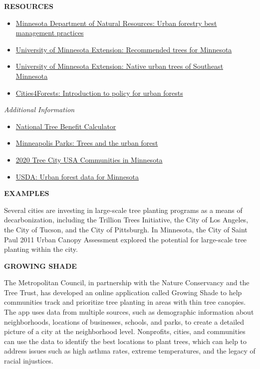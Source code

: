 \documentclass[
]{book}
\providecommand{\tightlist}{%
  \setlength{\itemsep}{0pt}\setlength{\parskip}{0pt}}
\begin{document}
\textbf{RESOURCES}

\begin{itemize}
\tightlist
\item
  \href{https://www.dnr.state.mn.us/forestry/urban/bmps.html}{Minnesota Department of Natural Resources: Urban forestry best management practices}
\item
  \href{https://extension.umn.edu/tree-selection-and-care/recommended-trees-minnesota}{University of Minnesota Extension: Recommended trees for Minnesota}
\item
  \href{https://www.minnesotamasternaturalist.org/docs/invasive_blitz/native_urban_trees_of_se_mn.pdf}{University of Minnesota Extension: Native urban trees of Southeast Minnesota}
\item
  \href{https://cities4forests.com/lg-urban-forests/introduction-to-policy-for-urban-forests/}{Cities4Forests: Introduction to policy for urban forests}
\end{itemize}

\emph{Additional Information}

\begin{itemize}
\tightlist
\item
  \href{http://www.treebenefits.com/calculator/}{National Tree Benefit Calculator}
\item
  \href{https://www.minneapolisparks.org/park_care__improvements/trees/}{Minneapolis Parks: Trees and the urban forest}
\item
  \href{https://www.dnr.state.mn.us/forestry/urban/tree-city-usa-awards.html\#cities}{2020 Tree City USA Communities in Minnesota}
\item
  \href{https://www.nrs.fs.fed.us/data/urban/state/?state=MN}{USDA: Urban forest data for Minnesota}
\end{itemize}

\textbf{EXAMPLES}

Several cities are investing in large-scale tree planting programs as a means of decarbonization, including the Trillion Trees Initiative, the City of Los Angeles, the City of Tucson, and the City of Pittsburgh. In Minnesota, the City of Saint Paul 2011 Urban Canopy Assessment explored the potential for large-scale tree planting within the city.

\textbf{GROWING SHADE}

The Metropolitan Council, in partnership with the Nature Conservancy and the Tree Trust, has developed an online application called Growing Shade to help communities track and prioritize tree planting in areas with thin tree canopies. The app uses data from multiple sources, such as demographic information about neighborhoods, locations of businesses, schools, and parks, to create a detailed picture of a city at the neighborhood level. Nonprofits, cities, and communities can use the data to identify the best locations to plant trees, which can help to address issues such as high asthma rates, extreme temperatures, and the legacy of racial injustices.
\end{document}
